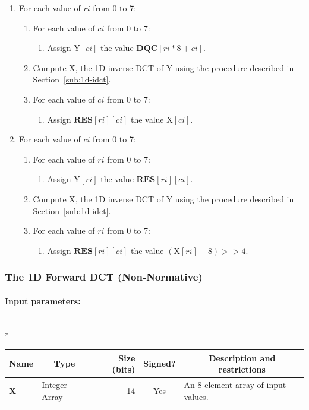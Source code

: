 \documentclass[9pt,letterpaper]{book}
\newcommand{\idx}[1]{{\ensuremath{\mathit{#1}}}}
\newcommand{\ci}{\idx{ci}}
\newcommand{\ri}{\idx{ri}}
\newcommand{\bitvar}[1]{\ensuremath{\mathbf{\bm{#1}}}}
\newcommand{\locvar}[1]{\ensuremath{\mathrm{#1}}}
\numberwithin{equation}{chapter}
\numberwithin{figure}{chapter}
\numberwithin{table}{chapter}
\begin{document}
\begin{enumerate}
\item
For each value of \locvar{\ri} from 0 to 7:
\begin{enumerate}
\item
For each value of \locvar{\ci} from 0 to 7:
\begin{enumerate}
\item
Assign $\locvar{Y}[\locvar{\ci}]$ the value
 $\bitvar{DQC}[\locvar{\ri}*8+\locvar{\ci}]$.
\end{enumerate}
\item
Compute \locvar{X}, the 1D inverse DCT of \locvar{Y} using the procedure
 described in Section~\ref{sub:1d-idct}.
\item
For each value of $\locvar{\ci}$ from 0 to 7:
\begin{enumerate}
\item
Assign $\bitvar{RES}[\locvar{\ri}][\locvar{\ci}]$ the value
 $\locvar{X}[\locvar{\ci}]$.
\end{enumerate}
\end{enumerate}
\item
For each value of \locvar{\ci} from 0 to 7:
\begin{enumerate}
\item
For each value of \locvar{\ri} from 0 to 7:
\begin{enumerate}
\item
Assign $\locvar{Y}[\locvar{\ri}]$ the value
 $\bitvar{RES}[\locvar{\ri}][\locvar{\ci}]$.
\end{enumerate}
\item
Compute \locvar{X}, the 1D inverse DCT of \locvar{Y} using the procedure
 described in Section~\ref{sub:1d-idct}.
\item
For each value of \locvar{\ri} from 0 to 7:
\begin{enumerate}
\item
Assign $\bitvar{RES}[\locvar{\ri}][\locvar{\ci}]$ the value
 $(\locvar{X}[\locvar{\ri}]+8)>>4$.
\end{enumerate}
\end{enumerate}
\end{enumerate}

\subsubsection{The 1D Forward DCT (Non-Normative)}

\paragraph{Input parameters:}\hfill\\*
\begin{tabularx}{\textwidth}{@{}llrcX@{}}\toprule
\multicolumn{1}{c}{Name} &
\multicolumn{1}{c}{Type} &
\multicolumn{1}{p{30pt}}{\centering Size (bits)} &
\multicolumn{1}{c}{Signed?} &
\multicolumn{1}{c}{Description and restrictions} \\\midrule\endhead
\bitvar{X}        & \multicolumn{1}{p{40pt}}{Integer Array} &
                              14 & Yes & An 8-element array of input values. \\
\bottomrule\end{tabularx}
\end{document}
